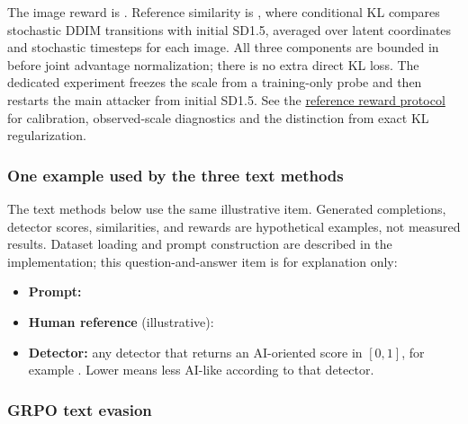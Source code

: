 The image reward is
\texttt{}.
Reference similarity is \texttt{},
where conditional KL compares stochastic DDIM transitions with initial
SD1.5, averaged over latent coordinates and stochastic timesteps for
each image. All three components are bounded in
\texttt{\seqsplit{[0, 1]}} before joint advantage normalization; there
is no extra direct KL loss. The dedicated experiment freezes the scale
from a training-only probe and then restarts the main attacker from
initial SD1.5. See the
\href{records/docs/image_reference_reward.tex}{reference reward
protocol} for calibration, observed-scale diagnostics and the
distinction from exact KL regularization.

\subsubsection{One example used by the three text
methods}\label{record-docs-research-guide-md-one-example-used-by-the-three-text-methods}

The text methods below use the same illustrative item. Generated
completions, detector scores, similarities, and rewards are hypothetical
examples, not measured results. Dataset loading and prompt construction
are described in the implementation; this question-and-answer item is
for explanation only:

\begin{itemize}
\tightlist
\item
  \textbf{Prompt:}
  \texttt{}
\item
  \textbf{Human reference} (illustrative):
  \texttt{}
\item
  \textbf{Detector:} any detector that returns an AI-oriented score in
  \([0, 1]\), for example \texttt{}. Lower
  means less AI-like according to that detector.
\end{itemize}

\subsubsection{GRPO text
evasion}\label{record-docs-research-guide-md-grpo-text-evasion}

